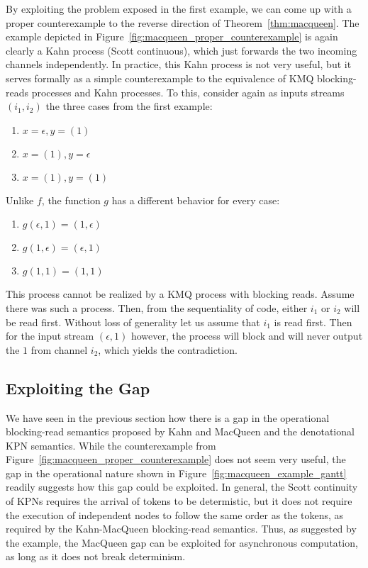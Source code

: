 By exploiting the problem exposed in the first example, we can come up with a proper counterexample to the reverse direction of Theorem~\ref{thm:macqueen}.
The example depicted in Figure~\ref{fig:macqueen_proper_counterexample} is again clearly a Kahn process (Scott continuous), which just forwards the two incoming channels independently.
In practice, this Kahn process is not very useful, but it serves formally as a simple counterexample to the equivalence of \ac{KMQ} blocking-reads processes and Kahn processes.
To this, consider again as inputs streams $(i_1,i_2)$ the three cases from the first example: 
\begin{enumerate}
\item $x = \epsilon, y = (1)$
\item $x = (1), y = \epsilon$
\item $x = (1), y = (1)$
\end{enumerate}

Unlike $f$, the function $g$ has a different behavior for every case:
\begin{enumerate}
\item $g(\epsilon,1) = (1,\epsilon)$
\item $g(1,\epsilon) = (\epsilon,1)$
\item $g(1,1) = (1,1)$
\end{enumerate}

This process cannot be realized by a \ac{KMQ} process with blocking reads. Assume there was such a process.
Then, from the sequentiality of code, either $i_1$ or $i_2$ will be read first.
Without loss of generality let us assume that $i_1$ is read first.
Then for the input stream $(\epsilon,1)$ however, the process will block and will never output the $1$ from channel $i_2$, which yields the contradiction.

\subsection{Exploiting the Gap}

We have seen in the previous section how there is a gap in the operational blocking-read semantics proposed by Kahn and MacQueen and the denotational \ac{KPN} semantics. While the counterexample from Figure~\ref{fig:macqueen_proper_counterexample} does not seem very useful, the gap in the operational nature shown in Figure~\ref{fig:macqueen_example_gantt} readily suggests how this gap could be exploited.
In general, the Scott continuity of \acp{KPN} requires the arrival of tokens to be determistic, but it does not require the execution of independent nodes to follow the same order as the tokens, as required by the Kahn-MacQueen blocking-read semantics. Thus, as suggested by the example, the MacQueen gap can be exploited for asynchronous computation, as long as it does not break determinism.


